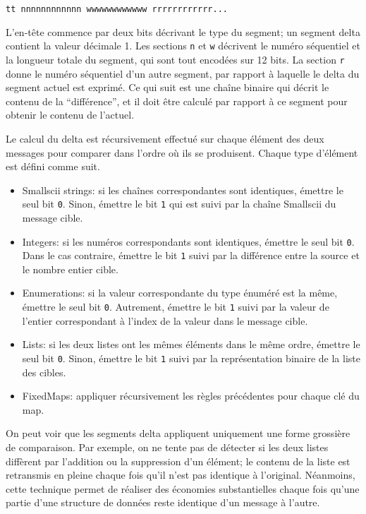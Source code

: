 \begin{verbatim}
tt nnnnnnnnnnnn wwwwwwwwwwww rrrrrrrrrrrr...
\end{verbatim}

L'en-tête commence par deux bits décrivant le type du segment; un segment delta contient la valeur décimale 1. Les sections \verb+n+ et \verb+w+ décrivent le numéro séquentiel et la longueur totale du segment, qui sont tout encodées sur 12 bits. La section \verb+r+ donne le numéro séquentiel d'un autre segment, par rapport à laquelle le delta du segment actuel est exprimé. Ce qui suit est une chaîne binaire qui décrit le contenu de la ``différence'', et il doit être calculé par rapport à ce segment pour obtenir le contenu de l'actuel.

Le calcul du delta est récursivement effectué sur chaque élément des deux messages pour comparer dans l'ordre où ils se produisent. Chaque type d'élément est défini comme suit.

\begin{itemize}
\item Smallscii strings: si les chaînes correspondantes sont identiques, émettre le seul bit \verb+0+. Sinon, émettre le bit \verb+1+ qui est suivi par la chaîne Smallscii du message cible.

\item Integers: si les numéros correspondants sont identiques, émettre le seul bit \verb+0+. Dans le cas contraire, émettre le bit \verb+1+ suivi par la différence entre la source et le nombre entier cible.

\item Enumerations: si la valeur correspondante du type énuméré est la même, émettre le seul bit \verb+0+. Autrement, émettre le bit \verb+1+ suivi par la valeur de l'entier correspondant à l'index de la valeur dans le message cible.

\item Lists: si les deux listes ont les mêmes éléments dans le même ordre, émettre le seul bit \verb+0+. Sinon, émettre le bit \verb+1+ suivi par la représentation binaire de la liste des cibles.

\item FixedMaps: appliquer récursivement les règles précédentes pour chaque clé du map.
\end{itemize}

On peut voir que les segments delta appliquent uniquement une forme grossière de comparaison. Par exemple, on ne tente pas de détecter si les deux listes diffèrent par l'addition ou la suppression d'un élément; le contenu de la liste est retransmis en pleine chaque fois qu'il n'est pas identique à l'original. Néanmoins, cette technique permet de réaliser des économies substantielles chaque fois qu'une partie d'une structure de données reste identique d'un message à l'autre.

